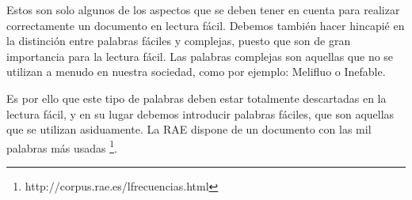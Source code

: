 Estos son solo algunos de los aspectos que se deben tener en cuenta para realizar correctamente un documento en lectura fácil. \newline
Debemos también hacer hincapié en la distinción entre palabras fáciles y complejas, puesto que son de gran importancia para la lectura fácil. 
Las palabras complejas son aquellas que no se utilizan a menudo en nuestra sociedad, como por ejemplo: Melifluo o Inefable.

Es por ello que este tipo de palabras deben estar totalmente descartadas en la lectura fácil, y en su lugar debemos introducir palabras fáciles, que son aquellas que se utilizan asiduamente. La RAE dispone de un documento con las mil palabras más usadas \footnote{http://corpus.rae.es/lfrecuencias.html}.

